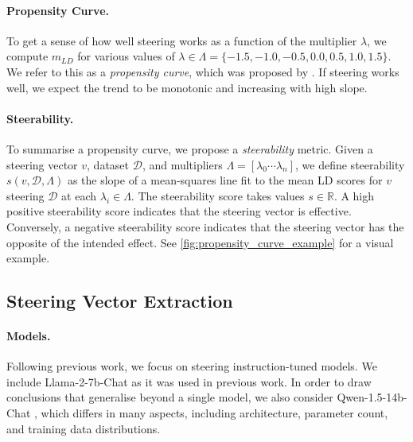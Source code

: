 \documentclass{article}
\begin{document}
\paragraph{Propensity Curve.} To get a sense of how well steering works as a function of the multiplier $\lambda$, we compute $m_{LD}$ for various values of $\lambda \in \Lambda = \{-1.5, -1.0, -0.5, 0.0, 0.5, 1.0, 1.5\}$. We refer to this as a \textit{propensity curve}, which was proposed by \cite{rimskySteeringLlamaContrastive2023}. If steering works well, we expect the trend to be monotonic and increasing with high slope. 

\paragraph{Steerability.} To summarise a propensity curve, we propose a \textit{steerability} metric. Given a steering vector $v$, dataset $\mathcal{D}$, and multipliers $\Lambda = [\lambda_0 \cdots \lambda_n]$, we define steerability $s(v, \mathcal{D}, \Lambda)$ as the slope of a mean-squares line fit to the mean LD scores for $v$ steering $\mathcal{D}$ at each $\lambda_i \in \Lambda$. The steerability score takes values $s \in \mathbb{R}$. A high positive steerability score indicates that the steering vector is effective. Conversely, a negative steerability score indicates that the steering vector has the opposite of the intended effect. See     \cref{fig:propensity_curve_example} for a visual example.

\subsection{Steering Vector Extraction}
\label{sec:steering_vector_extraction}

\paragraph{Models.} Following previous work, we focus on steering instruction-tuned models. We include Llama-2-7b-Chat \citep{touvronLlamaOpenFoundation2023} as it was used in previous work. In order to draw conclusions that generalise beyond a single model, we also consider Qwen-1.5-14b-Chat \citep{baiQwenTechnicalReport2023}, which differs in many aspects, including architecture, parameter count, and training data distributions. 
\end{document}
